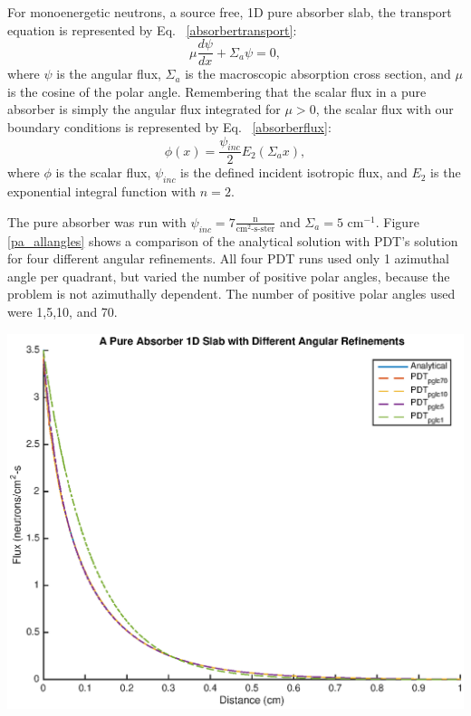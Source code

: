 For monoenergetic neutrons, a source free, 1D pure absorber slab, the transport equation is represented by Eq. ~\eqref{absorbertransport}:
\begin{equation}
\mu \frac{d\psi}{dx} + \Sigma_a \psi = 0,
\label{absorbertransport}
\end{equation}
where $\psi$ is the angular flux, $\Sigma_a$ is the macroscopic absorption cross section, and $\mu$ is the cosine of the polar angle. Remembering that the scalar flux in a pure absorber is simply the angular flux integrated for $\mu > 0$, the scalar flux with our boundary conditions is represented by Eq. ~\eqref{absorberflux}:
\begin{equation}
\phi(x) = \frac{\psi_{inc}}{2} E_{2}(\Sigma_a x),
\label{absorberflux}
\end{equation}
where $\phi$ is the scalar flux, $\psi_{inc}$ is the defined incident isotropic flux, and $E_2$ is the exponential integral function with $n=2$. 

The pure absorber was run with $\psi_{inc} = 7 \frac{\text{n}}{\text{cm}^2\text{-s-ster}}$ and $\Sigma_a = 5 \text{ cm}^{-1}$. Figure \ref{pa_allangles} shows a comparison of the analytical solution with PDT's solution for four different angular refinements. All four PDT runs used only 1 azimuthal angle per quadrant, but varied the number of positive polar angles, because the problem is not azimuthally dependent. The number of positive polar angles used were 1,5,10, and 70. 

\noindent\begin{minipage}{\textwidth}
\centering
\includegraphics[scale = 0.8]{figures/PureAbsorberAllAngles.eps}
\label{pa_allangles}
\end{minipage}
\smallskip

